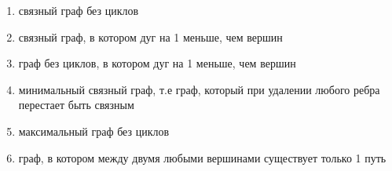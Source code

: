 \documentclass[discrete.tex]{subfiles}
\begin{document}
\begin{theorem}
    \begin{enumerate}
        \item связный граф без циклов
        \item связный граф, в котором дуг на 1 меньше, чем вершин
        \item граф без циклов, в котором дуг на 1 меньше, чем вершин
        \item минимальный связный граф, т.е граф, который при удалении любого ребра 
            перестает быть связным
        \item максимальный граф без циклов
        \item граф, в котором между двумя любыми вершинами существует только 1 путь
    \end{enumerate}
\end{theorem}
\end{document}
